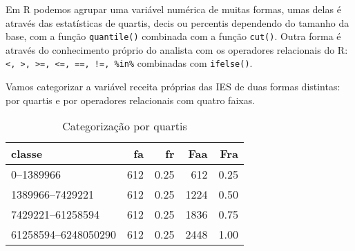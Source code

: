 \documentclass[12pt,]{style/krantz}
\makeatletter
\newenvironment{Shaded}{\begin{snugshade}}{\end{snugshade}}
\newcommand{\DataTypeTok}[1]{\textcolor[rgb]{0.13,0.29,0.53}{#1}}
\newcommand{\DecValTok}[1]{\textcolor[rgb]{0.00,0.00,0.81}{#1}}
\newcommand{\KeywordTok}[1]{\textcolor[rgb]{0.13,0.29,0.53}{\textbf{#1}}}
\newcommand{\NormalTok}[1]{#1}
\newcommand{\OperatorTok}[1]{\textcolor[rgb]{0.81,0.36,0.00}{\textbf{#1}}}
\newcommand{\OtherTok}[1]{\textcolor[rgb]{0.56,0.35,0.01}{#1}}
\newcommand{\StringTok}[1]{\textcolor[rgb]{0.31,0.60,0.02}{#1}}
\newenvironment{kframe}{%
\medskip{}
\setlength{\fboxsep}{.8em}
 \def\at@end@of@kframe{}%
 \ifinner\ifhmode%
  \def\at@end@of@kframe{\end{minipage}}%
  \begin{minipage}{\columnwidth}%
 \fi\fi%
 \def\FrameCommand##1{\hskip\@totalleftmargin \hskip-\fboxsep
 \colorbox{shadecolor}{##1}\hskip-\fboxsep
     \hskip-\linewidth \hskip-\@totalleftmargin \hskip\columnwidth}%
 \MakeFramed {\advance\hsize-\width
   \@totalleftmargin\z@ \linewidth\hsize
   \@setminipage}}%
 {\par\unskip\endMakeFramed%
 \at@end@of@kframe}
\renewenvironment{Shaded}{\begin{kframe}}{\end{kframe}}
\theoremstyle{definition}
\theoremstyle{definition}
\theoremstyle{definition}
\theoremstyle{remark}
\let\BeginKnitrBlock\begin \let\EndKnitrBlock\end
\makeatother
\begin{document}
Em R podemos agrupar uma variável numérica de muitas formas, umas delas é através das estatísticas de quartis, decis ou percentis dependendo do tamanho da base, com a função \texttt{quantile()} combinada com a função \texttt{cut()}. Outra forma é através do conhecimento próprio do analista com os operadores relacionais do R: \texttt{\textless{},\ \textgreater{},\ \textgreater{}=,\ \textless{}=,\ ==,\ !=,\ \%in\%} combinadas com \texttt{ifelse()}.

\BeginKnitrBlock{example}
\protect\hypertarget{exm:unnamed-chunk-59}{}{\label{exm:unnamed-chunk-59} }Vamos categorizar a variável receita próprias das IES de duas formas distintas: por quartis e por operadores relacionais com quatro faixas.
\EndKnitrBlock{example}

\begin{Shaded}
\end{Shaded}

\begin{table}[!h]

\caption{\label{tab:tab09}Categorização por quartis}
\centering
\begin{tabular}{lrrrr}
\toprule
classe & fa & fr & Faa & Fra\\
\midrule
0--1389966 & 612 & 0.25 & 612 & 0.25\\
1389966--7429221 & 612 & 0.25 & 1224 & 0.50\\
7429221--61258594 & 612 & 0.25 & 1836 & 0.75\\
61258594--6248050290 & 612 & 0.25 & 2448 & 1.00\\
\bottomrule
\end{tabular}
\end{table}
\end{document}
